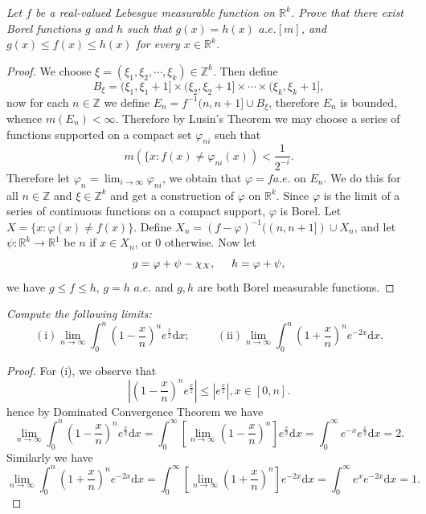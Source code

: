 \begin{problem}\em
Let $f$ be a real-valued Lebesgue measurable function on $\mathbb{R}^k$. Prove that there exist Borel functions $g$ and $h$ such that $g(x)=h(x)$ $a.e.[m]$, and $g(x)\le f(x)\le h(x)$ for every $x\in\mathbb{R}^k$.
\end{problem}
\begin{proof}
We choose $\xi=(\xi_1,\xi_2,\cdots,\xi_k)\in\mathbb{Z}^k$. Then define 
$$B_\xi=(\xi_1,\xi_1+1]\times(\xi_2,\xi_2+1]\times\cdots\times(\xi_k,\xi_k+1],$$
now for each $n\in\mathbb{Z}$ we define $E_n=f^{-1}(n,n+1]\cup B_\xi$, therefore $E_n$ is bounded, whence $m(E_n)<\infty$. Therefore by Lusin's Theorem we may choose a series of functions supported on a compact set $\varphi_{ni}$ such that 
$$m(\{x:f(x)\ne\varphi_{ni}(x))<\frac{1}{2^{-i}}.$$
Therefore let $\varphi_n=\lim_{i\to\infty}\varphi_{ni}$, we obtain that $\varphi=f a.e.$ on $E_n$. We do this for all $n\in\mathbb{Z}$ and $\xi\in\mathbb{Z}^k$ and get a construction of $\varphi$ on $\mathbb{R}^k$. Since $\varphi$ is the limit of a series of continuous functions on a compact support, $\varphi$ is Borel. Let $X=\{x:\varphi(x)\ne f(x)\}$. Define $X_n=(f-\varphi)^{-1}((n,n+1])\cup X_n$, and let $\psi:\mathbb{R}^k\to\mathbb{R}^1$ be $n$ if $x\in X_n$, or $0$ otherwise. Now let 
$$g=\varphi+\psi-\chi_X,\hspace{0.5cm}h=\varphi+\psi,$$
we have $g\le f\le h$, $g=h$ $a.e.$ and $g,h$ are both Borel measurable functions.
\end{proof}
\begin{problem}\em
Compute the following limits:
$$
\left( \mathrm{i} \right) \lim_{n\rightarrow \infty} \int_0^n{\left( 1-\frac{x}{n} \right) ^ne^{\frac{x}{2}}\mathrm{d}x};\hspace{1cm}\left( \mathrm{ii} \right) \lim_{n\rightarrow \infty} \int_0^n{\left( 1+\frac{x}{n} \right) ^ne^{-2x}\mathrm{d}x}.
$$
\end{problem}
\begin{proof}
For (i), we observe that 
$$
\left| \left( 1-\frac{x}{n} \right) ^ne^{\frac{x}{2}} \right|\le \left| e^{\frac{x}{2}} \right|,x\in \left[ 0,n \right] .
$$
hence by Dominated Convergence Theorem we have 
$$
\lim_{n\rightarrow \infty} \int_0^n{\left( 1-\frac{x}{n} \right) ^ne^{\frac{x}{2}}\mathrm{d}x}=\int_0^{\infty}{\left[ \lim_{n\rightarrow \infty} \left( 1-\frac{x}{n} \right) ^n \right] e^{\frac{x}{2}}\mathrm{d}x}=\int_0^{\infty}{e^{-x}e^{\frac{x}{2}}\mathrm{d}x}=2.
$$
Similarly we have 
$$
\lim_{n\rightarrow \infty} \int_0^n{\left( 1+\frac{x}{n} \right) ^ne^{-2x}\mathrm{d}x}=\int_0^{\infty}{\left[ \lim_{n\rightarrow \infty} \left( 1+\frac{x}{n} \right) ^n \right] e^{-2x}\mathrm{d}x}=\int_0^{\infty}{e^xe^{-2x}\mathrm{d}x}=1.
$$
\end{proof}
